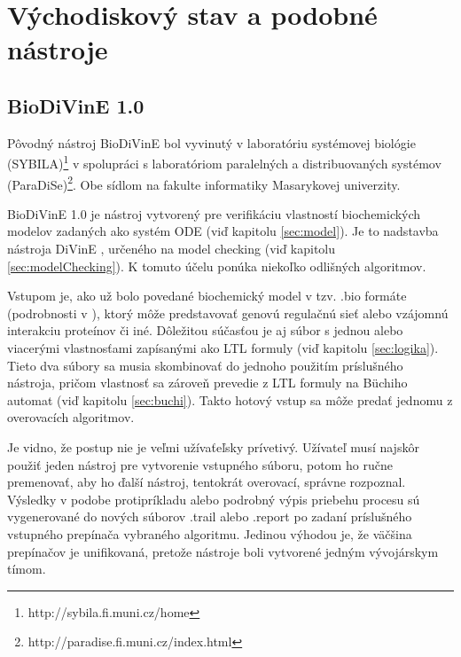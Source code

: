 \documentclass[11pt,final,oneside]{fithesis}
\begin{document}
\chapter{V\'ychodiskov\'y stav a podobn\' e n\'astroje}

\section{BioDiVinE 1.0}
\label{sec:biodivine}
P\^ ovodn\'y n\'astroj BioDiVinE bol vyvinut\'y v laborat\'oriu syst\'emovej biol\'ogie (SYBILA)\footnote{http://sybila.fi.muni.cz/home} v spolupr\'aci 
s laborat\'oriom paraleln\'ych a distribuovan\'ych syst\'emov (ParaDiSe)\footnote{http://paradise.fi.muni.cz/index.html}. Obe s\'idlom na fakulte 
informatiky Masarykovej univerzity. 

BioDiVinE 1.0 je n\'astroj vytvoren\'y pre verifik\'aciu vlastnost\'i biochemick\'ych modelov zadan\'ych ako syst\'em ODE (vi\v d kapitolu \ref{sec:model}).
Je to nadstavba n\'astroja DiVinE \cite{divine}, ur\v cen\'eho na model checking (vi\v d kapitolu \ref{sec:modelChecking}). K tomuto 
\'u\v celu pon\'uka nieko\v lko odli\v sn\'ych algoritmov.

Vstupom je, ako u\v z bolo povedan\'e biochemick\'y model v tzv. .bio form\'ate (podrobnosti v \cite{sybila-biodivine}), ktor\'y 
m\^ o\v ze predstavova\v t genov\'u regula\v cn\'u sie\v t alebo vz\'ajomn\'u interakciu prote\'inov \v ci in\'e. D\^ ole\v zitou s\'u\v cas\v tou je aj
s\'ubor s jednou alebo viacer\'ymi vlastnos\v tami zap\'isan\'ymi ako LTL formuly (vi\v d kapitolu \ref{sec:logika}). Tieto dva s\'ubory sa musia skombinova\v t
do jednoho pou\v zit\'im pr\'islu\v sn\'eho n\'astroja, pri\v com vlastnos\v t sa z\'arove\v n prevedie z LTL formuly na B\" uchiho automat (vi\v d kapitolu 
\ref{sec:buchi}). Takto hotov\'y vstup sa m\^ o\v ze preda\v t jednomu z overovac\'ich algoritmov.

Je vidno, \v ze postup nie je ve\v lmi u\v z\'iva\v te\v lsky pr\'ivetiv\'y. U\v z\'ivate\v l mus\'i najsk\^ or pou\v zi\v t jeden n\'astroj 
pre vytvorenie vstupn\'eho s\'uboru, potom ho ru\v cne premenova\v t, aby ho \v dal\v s\'i n\'astroj, tentokr\'at overovac\'i, spr\'avne rozpoznal. V\'ysledky
v podobe protipr\'ikladu alebo podrobn\'y v\'ypis priebehu procesu s\'u vygenerovan\'e do nov\'ych s\'uborov .trail alebo .report po zadan\'i pr\'islu\v sn\'eho
vstupn\'eho prep\'ina\v ca vybran\'eho algoritmu. Jedinou v\'yhodou je, \v ze v\"a\v c\v sina prep\'ina\v cov je unifikovan\'a, preto\v ze n\'astroje boli vytvoren\'e
jedn\'ym v\'yvoj\'arskym t\'imom.
\end{document}
